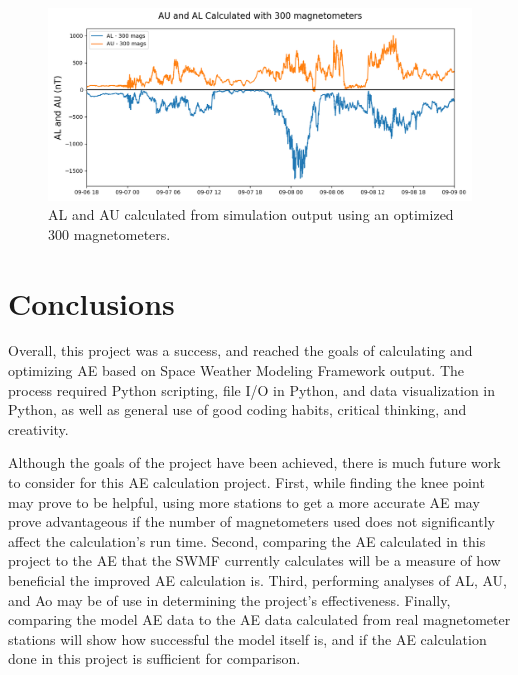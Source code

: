\documentclass[12pt, letterpaper]{article}
\begin{document}
\begin{figure}[!ht]
  \centering
  \includegraphics[width=14cm]{../ae_plots_LaTeX/al_au_300.png}
  \caption{AL and AU calculated from simulation output using an optimized 300 magnetometers.}
  \label{fig:alau300}
\end{figure}

\section{Conclusions} \label{conc}

Overall, this project was a success, and reached the goals of calculating and optimizing AE based on Space Weather Modeling Framework output. The process required Python scripting, file I/O in Python, and data visualization in Python, as well as general use of good coding habits, critical thinking, and creativity.

Although the goals of the project have been achieved, there is much future work to consider for this AE calculation project. First, while finding the knee point may prove to be helpful, using more stations to get a more accurate AE may prove advantageous if the number of magnetometers used does not significantly affect the calculation's run time. Second, comparing the AE calculated in this project to the AE that the SWMF currently calculates will be a measure of how beneficial the improved AE calculation is. Third, performing analyses of AL, AU, and Ao may be of use in determining the project's effectiveness. Finally, comparing the model AE data to the AE data calculated from real magnetometer stations will show how successful the model itself is, and if the AE calculation done in this project is sufficient for comparison. 
\end{document}
